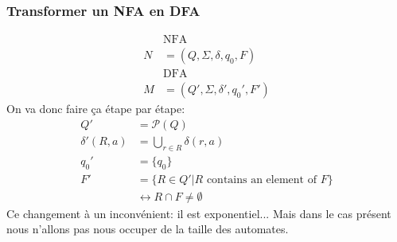 \documentclass[a4paper,12pt]{article}
\begin{document}
    \subsubsection{Transformer un NFA en DFA}
      \begin{align*}
	&\text{NFA} \\
	N &= (Q, \Sigma, \delta, q_0, F)\\
	&\text{DFA} \\
	M &= (Q', \Sigma, \delta', q_0', F')
      \end{align*}
      On va donc faire ça étape par étape:
      \begin{align*}
	Q' &= \mathcal P(Q)\\
	\delta'(R, a) &= \bigcup_{r \in R} \delta(r, a)\\
	q_0' &= \{q_0\}\\
	F' &= \{R \in Q' | R \text{ contains an element of } F\}\\
	& \leftrightarrow R \cap F \neq \emptyset
      \end{align*}
      Ce changement à un inconvénient: il est exponentiel...  Mais dans le cas présent nous n'allons pas nous occuper de la taille des automates.
\end{document}
